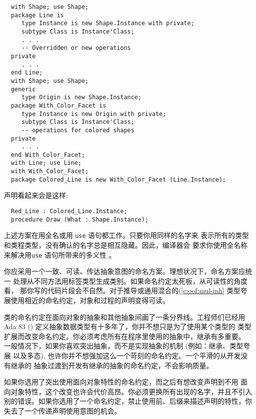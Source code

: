 \begin{blockindent}
\begin{lstlisting}
  with Shape; use Shape;
  package Line is
     type Instance is new Shape.Instance with private;
     subtype Class is Instance'Class;
     . . .
     -- Overridden or new operations
  private
     . . .
  end Line;
  with Shape; use Shape;
  generic
     type Origin is new Shape.Instance;
  package With_Color_Facet is
     type Instance is new Origin with private;
     subtype Class is Instance'Class;
     -- operations for colored shapes
  private
     . . .
  end With_Color_Facet;
  with Line; use Line;
  with With_Color_Facet;
  package Colored_Line is new With_Color_Facet (Line.Instance);
\end{lstlisting}
声明看起来会是这样:
\begin{lstlisting}
  Red_Line : Colored_Line.Instance;
  procedure Draw (What : Shape.Instance);
\end{lstlisting}
上述方案在用全名或用 \texttt{use} 语句都工作。只要你用同样的名字来
表示所有的类型和类程类型，没有确认的名字总是相互隐藏。因此，编译器会
要求你使用全名称来解决用\texttt{use} 语句所带来的多义性 \cite{rosen95}。
\end{blockindent}

\begin{blockindent}
你应采用一个一致、可读、传达抽象意图的命名方案。理想状况下，命名方案应统一
处理从不同方法用标签类型生成类别。如果命名约定太死板，从可读性的角度看，
那你写的代码片段会不自然。对于推导或通用混合的(\ref{c:oof:mul-inh}
类型夸展使用相近的命名约定，对象和过程的声明变得可读。
\end{blockindent}

\begin{blockindent}
类的命名约定在面向对象的抽象和其他抽象间画了一条分界线。工程师们已经用 Ada 83
(\cite{arm83}) 定义抽象数据类型有十多年了，你并不想只是为了使用某个类型的
类型扩展而改变命名约定。你必须考虑所有在程序里使用的抽象中，继承有多重要。
一般情况下，如果你喜欢突出抽象，而不是实现抽象的机制 (例如：继承、类型夸展
以及多态), 也许你并不想强加这么一个苛刻的命名约定。一个平滑的从开发没有继承的
抽象过渡到开发有继承的抽象的命名约定，不会影响质量。

如果你选用了突出使用面向对象特性的命名约定，而之后有想改变声明到不用
面向对象特性，这个改变也许会代价高昂。你必须更换所有出现的名字，并且不引入
别的错误。如果你选用了一个命名约定，禁止使用前、后缀来描述声明的特性，你
失去了一个传递声明使用意图的机会。
\end{blockindent}

